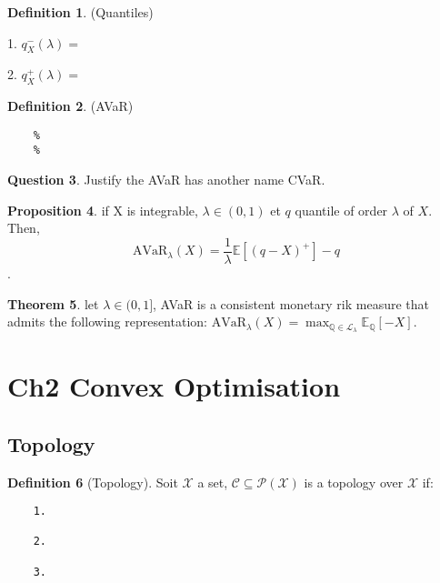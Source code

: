 \documentclass[letterpaper, 11pt]{article}
\let\mc\mathcal
\newcommand{\Q}{\mathbb{Q}}   %
\newcommand{\E}{\mathbb{E}}     %
\newcommand{\1}{\mathds{1}}	%
\theoremstyle{definition}
\newtheorem{theorem}{Theorem}[section]
\newtheorem{proposition}[theorem]{Proposition}
\newtheorem{definition}[theorem]{Definition}
\newtheorem{question}[theorem]{Question}
\begin{document}
\begin{definition}{(Quantiles)}

    1. $q_{X}^{-}(\lambda) =$

    2. $q_{X}^{+}(\lambda) =$
\end{definition}

\begin{definition}{(AVaR)}
\end{definition}
\begin{lstlisting}
    %
    %
\end{lstlisting}

\begin{question}
    Justify the AVaR has another name CVaR.
\end{question}
\begin{proposition}
    if X is integrable, $\lambda \in (0,1)$ et $q$ quantile of order $\lambda$ of $X$. 
    Then, $$\text{AVaR}_{\lambda}(X) = \frac{1}{\lambda}\E[(q-X)^{+}]-q$$.
\end{proposition}
\begin{theorem}
    let $\lambda \in (0,1]$, AVaR is a consistent monetary rik measure that admits the following representation:
    $\text{AVaR}_{\lambda}(X)=\max_{\Q \in \mc{L}_{\lambda}} \E_{\Q}[-X]$.
\end{theorem}

\section{Ch2 Convex Optimisation}
\subsection{Topology}
\begin{definition}[Topology]
    Soit $\mc{X}$ a set, $\mc{C} \subseteq \mc{P}(\mc{X})$ is a topology over $\mc{X}$ if:
\end{definition}
\begin{lstlisting}
    1.

    2.

    3.
\end{lstlisting}
\end{document}
